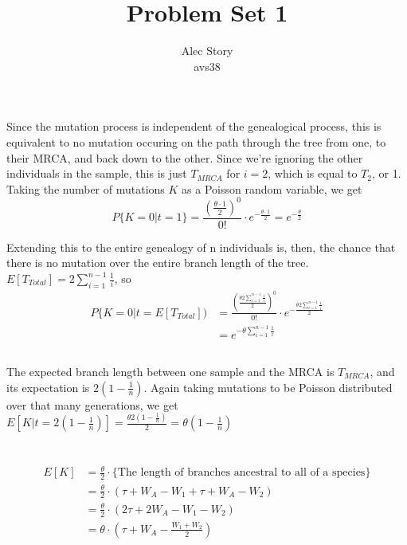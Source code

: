 \documentclass{article}
\title{Problem Set 1}
\author{Alec Story \\ \small{avs38}}
\begin{document}
\maketitle

\section{}
\subsection{}
Since the mutation process is independent of the genealogical process, this is
equivalent to no mutation occuring on the path through the tree from one, to
their MRCA, and back down to the other.  Since we're ignoring the other
individuals in the sample, this is just $T_{MRCA}$ for $i=2$, which is equal to
$T_2$, or 1.  Taking the number of mutations $K$ as a Poisson random variable, we
get $$P\{K=0 | t=1\} = \frac{(\frac{\theta \cdot 1}{2})^0}{0!} \cdot
                      e^{-\frac{\theta \cdot 1}{2}}
                    = e ^{-\frac{\theta}{2}}$$

Extending this to the entire genealogy of n individuals is, then, the chance
that there is no mutation over the entire branch length of the tree.
$E[T_{Total}] = 2 \sum_{i=1}^{n-1} \frac{1}{i}$, so
\begin{align*}
 P\{K=0 | t = E[T_{Total}]) &= \frac{(\frac{
                               \theta 2 \sum_{i=1}^{n-1} \frac{1}{i}}{2})^0}{0!}
                               \cdot
                               e^{-\frac{
                               \theta 2 \sum_{i=1}^{n-1} \frac{1}{i}}{2}} \\
                            &= e^{-\theta \sum_{i=1}^{n-1} \frac{1}{i}}
\end{align*}
\subsection{}
The expected branch length between one sample and the MRCA is $T_{MRCA}$, and
its expectation is $2(1-\frac{1}{n})$.  Again taking mutations to be Poisson
distributed over that many generations, we get $E[K|t=2(1-\frac{1}{n})] =
\frac{\theta 2(1-\frac{1}{n})}{2} = \theta (1-\frac{1}{n})$
\section{}
\section{}
\begin{align*}
E[K] &= \frac{\theta}{2} \cdot \{\textrm{The length of branches ancestral to
                                          all of a species}\} \\
     &= \frac{\theta}{2} \cdot (\tau + W_A - W_1 + \tau + W_A - W_2) \\
     &= \frac{\theta}{2} \cdot (2 \tau + 2 W_A - W_1 - W_2) \\
     &= \theta \cdot (\tau + W_A - \frac{W_1 + W_2}{2})
\end{align*}
\end{document}
